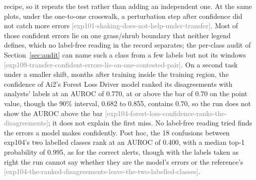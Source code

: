 \documentclass[11pt,a4paper]{article}
\newcommand{\claim}[1]{{\scriptsize\textsf{\textcolor{gray}{[#1]}}}}
\begin{document}
recipe, so it repeats the test rather than adding an independent one. At the same plots, under the one-to-one crosswalk, a
perturbation step after confidence did not catch more errors \claim{exp101-shaking-does-not-help-under-transfer}.
Most of those confident errors lie on one grass/shrub boundary that neither legend defines, which no label-free reading
in the record separates; the per-class audit of Section~\ref{sec:audit} can name such a class from a few labels but not
its windows \claim{exp109-transfer-confident-errors-lie-on-one-contested-pair}. On a
second task under a smaller shift, months
after training inside the training region, the confidence of Ai2's Forest Loss Driver model ranked its disagreements
with analysts' labels at an AUROC of 0.770, at or above the bar of 0.70 on the point value, though the 90\% interval,
0.682 to 0.855, contains 0.70, so the run does not show the AUROC above the bar
\claim{exp104-forest-loss-confidence-ranks-the-disagreements}; it does not explain the first miss. No label-free reading
tried finds the errors a model makes confidently. Post hoc, the 18 confusions between exp104's two labelled classes rank
at an AUROC of 0.400, with a median top-1 probability of 0.995, as for the correct alerts, though with the labels taken
as right the run cannot say whether they are the model's errors or the reference's
\claim{exp104-the-ranked-disagreements-leave-the-two-labelled-classes}.
\end{document}

